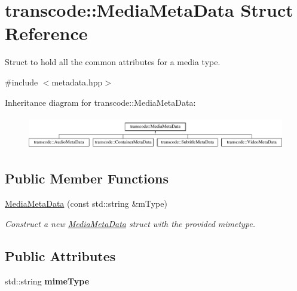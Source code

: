 \hypertarget{structtranscode_1_1MediaMetaData}{
\section{transcode::MediaMetaData Struct Reference}
\label{structtranscode_1_1MediaMetaData}
}


Struct to hold all the common attributes for a media type.  




{\ttfamily \#include $<$metadata.hpp$>$}

Inheritance diagram for transcode::MediaMetaData:\begin{figure}[H]
\begin{center}
\leavevmode
\includegraphics[height=1.465969cm]{structtranscode_1_1MediaMetaData}
\end{center}
\end{figure}
\subsection*{Public Member Functions}
\begin{DoxyCompactItemize}
\item 
\hyperlink{structtranscode_1_1MediaMetaData_ab9e99a1ca5a89900e6514ae29b40f1e6}{MediaMetaData} (const std::string \&mType)
\begin{DoxyCompactList}\small\item\em Construct a new \hyperlink{structtranscode_1_1MediaMetaData}{MediaMetaData} struct with the provided mimetype. \item\end{DoxyCompactList}\end{DoxyCompactItemize}
\subsection*{Public Attributes}
\begin{DoxyCompactItemize}
\item 
\hypertarget{structtranscode_1_1MediaMetaData_a83154da5545a20f2bb9f36a5406e01a1}{
std::string {\bfseries mimeType}}
\label{structtranscode_1_1MediaMetaData_a83154da5545a20f2bb9f36a5406e01a1}

\end{DoxyCompactItemize}


